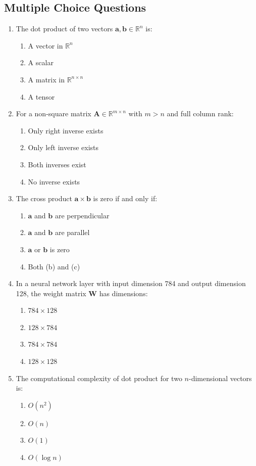 \documentclass[12pt,a4paper]{article}
\theoremstyle{definition}
\begin{document}
\subsection{Multiple Choice Questions}

\begin{enumerate}[resume]
\item The dot product of two vectors $\mathbf{a}, \mathbf{b} \in \mathbb{R}^n$ is:
\begin{enumerate}[label=(\alph*)]
\item A vector in $\mathbb{R}^n$
\item A scalar
\item A matrix in $\mathbb{R}^{n \times n}$
\item A tensor
\end{enumerate}

\item For a non-square matrix $\mathbf{A} \in \mathbb{R}^{m \times n}$ with $m > n$ and full column rank:
\begin{enumerate}[label=(\alph*)]
\item Only right inverse exists
\item Only left inverse exists
\item Both inverses exist
\item No inverse exists
\end{enumerate}

\item The cross product $\mathbf{a} \times \mathbf{b}$ is zero if and only if:
\begin{enumerate}[label=(\alph*)]
\item $\mathbf{a}$ and $\mathbf{b}$ are perpendicular
\item $\mathbf{a}$ and $\mathbf{b}$ are parallel
\item $\mathbf{a}$ or $\mathbf{b}$ is zero
\item Both (b) and (c)
\end{enumerate}

\item In a neural network layer with input dimension 784 and output dimension 128, the weight matrix $\mathbf{W}$ has dimensions:
\begin{enumerate}[label=(\alph*)]
\item $784 \times 128$
\item $128 \times 784$
\item $784 \times 784$
\item $128 \times 128$
\end{enumerate}

\item The computational complexity of dot product for two $n$-dimensional vectors is:
\begin{enumerate}[label=(\alph*)]
\item $O(n^2)$
\item $O(n)$
\item $O(1)$
\item $O(\log n)$
\end{enumerate}
\end{enumerate}
\end{document}
